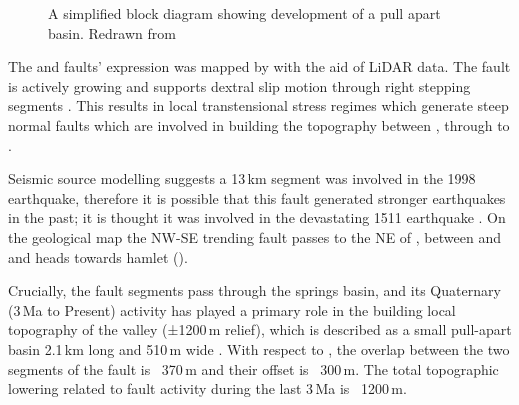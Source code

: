 \begin{figure}[t!]
\checkoddpage \ifoddpage \forcerectofloat \else \forceversofloat \fi
\centering
{}
\caption{A simplified block diagram showing development of a pull apart basin. Redrawn from \citet{WU20091608}}
\label{fig:fault}
\end{figure}

The  and  faults' expression was mapped by \citet{cunningham2006application} with the aid of LiDAR data. The  fault is actively growing and supports dextral slip motion through right stepping segments \citep{kastelic2008neo}.
This results in local transtensional stress regimes which generate steep normal faults which are involved in building the topography between , through to . 


Seismic source modelling suggests a 13\,km  segment was involved in the 1998 earthquake, therefore it is possible that this fault generated stronger earthquakes in the past; it is thought it was involved in the devastating 1511 earthquake \citep{fitzko2005constraints}.
On the geological map the NW-SE trending fault passes to the NE of , between  and  and heads towards  hamlet ().

Crucially, the  fault segments pass through the  springs basin, and its Quaternary (3\,Ma to Present) activity has played a primary role in the building local topography of the  valley (±1200\,m relief), which is described as a small pull-apart basin 2.1\,km long and 510\,m wide \citep{cunningham2006application,kastelic2008neo}. With respect to , the overlap between the two segments of the  fault is ~370\,m and their offset is ~300\,m. The total topographic lowering related to fault activity during the last 3\,Ma is ~1200\,m.

